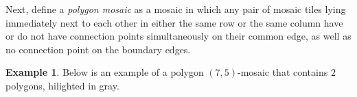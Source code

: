\documentclass[12pt]{article}
\theoremstyle{plain}
\theoremstyle{definition}
\theoremstyle{remark}
\theoremstyle{definition}
\newtheorem{exmp}{Example}[section]
\newcommand{\cell}[4]{ \draw[thick] ( #1 , #2 ) rectangle ( #3 , #4 );}
\newcommand{\cellA}[4]{ \draw[thick] ( #1 , #2 ) rectangle ( #3 , #4 ); \draw[red, thick] (#3 * 0.5 + #1 * 0.5 , #2) -- (#3, #4 * 0.5 + #2 * 0.5);}
\newcommand{\cellB}[4]{ \draw[thick] ( #1 , #2 ) rectangle ( #3 , #4 ); \draw[red, thick] (#3 * 0.5 + #1 * 0.5 , #2) -- (#1, #4 * 0.5 + #2 * 0.5);}
\newcommand{\cellC}[4]{ \draw[thick] ( #1 , #2 ) rectangle ( #3 , #4 ); \draw[red, thick] (#3 * 0.5 + #1 * 0.5 , #4) -- (#1, #4 * 0.5 + #2 * 0.5);}
\newcommand{\cellD}[4]{ \draw[thick] ( #1 , #2 ) rectangle ( #3 , #4 ); \draw[red, thick] (#3 * 0.5 + #1 * 0.5 , #4) -- (#3, #4 * 0.5 + #2 * 0.5);}
\newcommand{\cellE}[4]{ \draw[thick] ( #1 , #2 ) rectangle ( #3 , #4 ); \draw[red, thick] (#3 * 0.5 + #1 * 0.5 , #2) -- (#3 * 0.5 + #1 * 0.5 , #4);}
\newcommand{\cellF}[4]{ \draw[thick] ( #1 , #2 ) rectangle ( #3 , #4 ); \draw[red, thick] (#3, #4 * 0.5 + #2 * 0.5) -- (#1, #4 * 0.5 + #2 * 0.5);}
\newcommand{\cellAf}[4]{\filldraw[gray!40] ( #1 , #2 ) rectangle ( #3 , #4 ); \draw[thick] ( #1 , #2 ) rectangle ( #3 , #4 ); \draw[red, thick] (#3 * 0.5 + #1 * 0.5 , #2) -- (#3, #4 * 0.5 + #2 * 0.5);}
\newcommand{\cellBf}[4]{\filldraw[gray!40] ( #1 , #2 ) rectangle ( #3 , #4 ); \draw[thick] ( #1 , #2 ) rectangle ( #3 , #4 ); \draw[red, thick] (#3 * 0.5 + #1 * 0.5 , #2) -- (#1, #4 * 0.5 + #2 * 0.5);}
\newcommand{\cellCf}[4]{\filldraw[gray!40] ( #1 , #2 ) rectangle ( #3 , #4 ); \draw[thick] ( #1 , #2 ) rectangle ( #3 , #4 ); \draw[red, thick] (#3 * 0.5 + #1 * 0.5 , #4) -- (#1, #4 * 0.5 + #2 * 0.5);}
\newcommand{\cellDf}[4]{\filldraw[gray!40] ( #1 , #2 ) rectangle ( #3 , #4 ); \draw[thick] ( #1 , #2 ) rectangle ( #3 , #4 ); \draw[red, thick] (#3 * 0.5 + #1 * 0.5 , #4) -- (#3, #4 * 0.5 + #2 * 0.5);}
\newcommand{\cellEf}[4]{\filldraw[gray!40] ( #1 , #2 ) rectangle ( #3 , #4 ); \draw[thick] ( #1 , #2 ) rectangle ( #3 , #4 ); \draw[red, thick] (#3 * 0.5 + #1 * 0.5 , #2) -- (#3 * 0.5 + #1 * 0.5 , #4);}
\newcommand{\cellFf}[4]{\filldraw[gray!40] ( #1 , #2 ) rectangle ( #3 , #4 ); \draw[thick] ( #1 , #2 ) rectangle ( #3 , #4 ); \draw[red, thick] (#3, #4 * 0.5 + #2 * 0.5) -- (#1, #4 * 0.5 + #2 * 0.5);}
\begin{document}
\begin{center}
\end{center}

Next, define a \textit{polygon mosaic} as a mosaic in which any pair of mosaic tiles lying immediately next to each other in either the same row or the same column have or do not
have connection points simultaneously on their common edge, as well as no connection point on the boundary edges. 

\begin{exmp}
\label{exmp: clean sap}
Below is an example of a polygon $(7,5)$-mosaic that contains $2$ polygons, hilighted in gray.

\begin{center}
\end{center}
\end{exmp}
\end{document}
